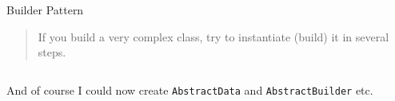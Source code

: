 \begin{frame}[t]{Builder Pattern}
	\begin{quote}
		If you build a very complex class, try to instantiate (build) it in several steps.
	\end{quote}

	\inputminted{python}{code/patterns/creational/builder_best.py}
	And of course I could now create \texttt{AbstractData} and \texttt{AbstractBuilder} etc.
\end{frame}
